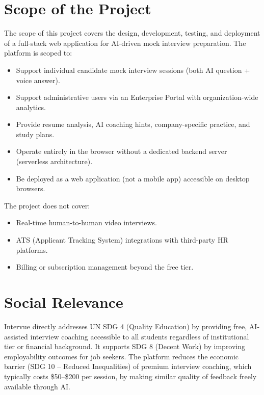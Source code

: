 \section{Scope of the Project}
The scope of this project covers the design, development, testing, and deployment of a full-stack
web application for AI-driven mock interview preparation. The platform is scoped to:
\begin{itemize}
	\item Support individual candidate mock interview sessions (both AI question + voice answer).
	\item Support administrative users via an Enterprise Portal with organization-wide analytics.
	\item Provide resume analysis, AI coaching hints, company-specific practice, and study plans.
	\item Operate entirely in the browser without a dedicated backend server (serverless architecture).
	\item Be deployed as a web application (not a mobile app) accessible on desktop browsers.
\end{itemize}
The project does not cover:
\begin{itemize}
	\item Real-time human-to-human video interviews.
	\item ATS (Applicant Tracking System) integrations with third-party HR platforms.
	\item Billing or subscription management beyond the free tier.
\end{itemize}

\section{Social Relevance}
Intervue directly addresses UN SDG 4 (Quality Education) by providing free, AI-assisted
interview coaching accessible to all students regardless of institutional tier or financial
background. It supports SDG 8 (Decent Work) by improving employability outcomes for job
seekers. The platform reduces the economic barrier (SDG 10 -- Reduced Inequalities) of
premium interview coaching, which typically costs \$50--\$200 per session, by making similar
quality of feedback freely available through AI.


